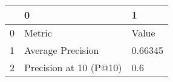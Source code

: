 \begin{tabular}{lll}
\toprule
{} &                       0 &        1 \\
\midrule
0 &                  Metric &    Value \\
1 &       Average Precision &  0.66345 \\
2 &  Precision at 10 (P@10) &      0.6 \\
\bottomrule
\end{tabular}
